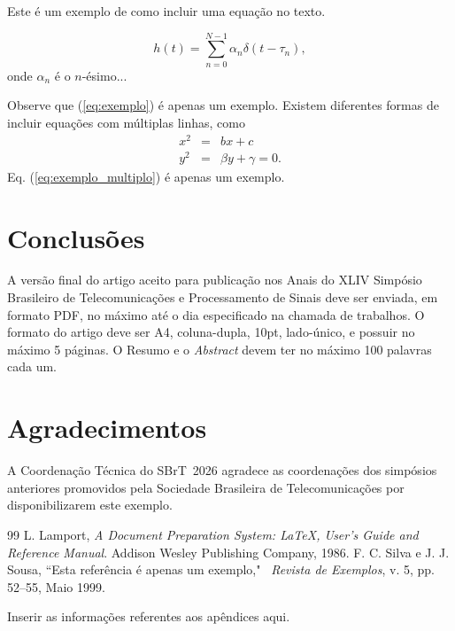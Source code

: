 \documentclass{sbrt}
\begin{document}
Este é um exemplo de como incluir uma equação no texto.

\begin{equation}\label{eq:exemplo}
    h(t)=\sum_{n=0}^{N-1} \alpha_n\delta(t-\tau_n),
\end{equation}
onde $\alpha_n$ é o $n$-ésimo...

Observe que (\ref{eq:exemplo}) é apenas um exemplo. Existem diferentes formas de incluir equações com múltiplas linhas, como
\begin{equation} \label{eq:exemplo_multiplo}
    \begin{array}{ccl}
        x^2 & = & bx+c\\
        y^2 & = &\beta y+\gamma=0.
    \end{array}
\end{equation}
Eq. (\ref{eq:exemplo_multiplo}) é apenas um exemplo.

\clearpage
\section{Conclusões}
A versão final do artigo aceito para publicação nos Anais do XLIV Simpósio Brasileiro de Telecomunicações e Processamento de Sinais deve ser enviada, em formato PDF, no máximo até o dia especificado na chamada de trabalhos. O formato do artigo deve ser A4, coluna-dupla, 10pt, lado-único, e possuir no máximo 5 páginas. O Resumo e o \emph{Abstract} devem ter no máximo 100 palavras cada um.

\section*{Agradecimentos}
A Coordenação Técnica do SBrT~2026 agradece as coordenações dos simpósios anteriores promovidos pela Sociedade Brasileira de Telecomunicações por disponibilizarem este exemplo.

\begin{thebibliography}{99}
 L. Lamport, \textit{A Document Preparation System: \LaTeX, User's
Guide and Reference Manual}. Addison Wesley Publishing Company,
1986.
 F. C. Silva e J. J. Sousa, ``Esta referência é apenas um exemplo," ~\textit{Revista de Exemplos}, v. 5, pp. 52--55, Maio
1999.
\end{thebibliography}


\appendix
Inserir as informações referentes aos apêndices aqui.
\end{document}
